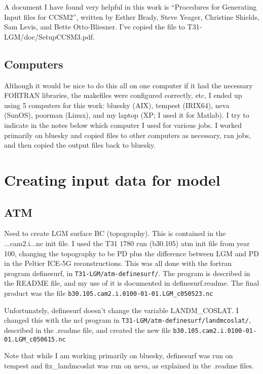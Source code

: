 \documentclass[authoryear,round,12pt]{article}
\begin{document}
A document I have found very helpful in this work is ``Procedures for
Generating Input files for CCSM2'', written by Esther Brady, Steve
Yeager, Christine Shields, Sam Levis, and Bette Otto-Bliesner. I've
copied the file to T31-LGM/doc/SetupCCSM3.pdf.

\subsection{Computers}

Although it would be nice to do this all on one computer if it had the
necessary FORTRAN libraries, the makefiles were configured correctly,
etc, I ended up using 5 computers for this work: bluesky (AIX),
tempest (IRIX64), neva (SunOS), poorman (Linux), and my laptop (XP; I
used it for Matlab). I try to indicate in the notes below which
computer I used for various jobs. I worked primarily on bluesky and
copied files to other computers as necessary, ran jobs, and then
copied the output files back to bluesky.

\section{Creating input data for model}
\label{sec:data}

\subsection{ATM}

Need to create LGM surface BC (topography). This is contained in the
...cam2.i...nc init file. I used the T31 1780 run (b30.105) atm init
file from year 100, changing the topography to be PD plus the
difference between LGM and PD in the Peltier ICE-5G
reconstructions. This was all done with the fortran program
definesurf, in \verb+T31-LGM/atm-definesurf/+. The program is
described in the README file, and my use of it is documented in
definesurf.readme. The final product was the file
\verb+b30.105.cam2.i.0100-01-01.LGM_c050523.nc+

Unfortunately, definesurf doesn't change the variable
LANDM{\_}COSLAT. I changed this with the ncl program in
\verb+T31-LGM/atm-definesurf/landmcoslat/+, described in the .readme
file, and created the new file
\verb+b30.105.cam2.i.0100-01-01.LGM_c050615.nc+

Note that while I am working primarily on bluesky, definesurf was run
on tempest and fix{\_}landmcoslat was run on neva, as explained in the
.readme files.
\end{document}
